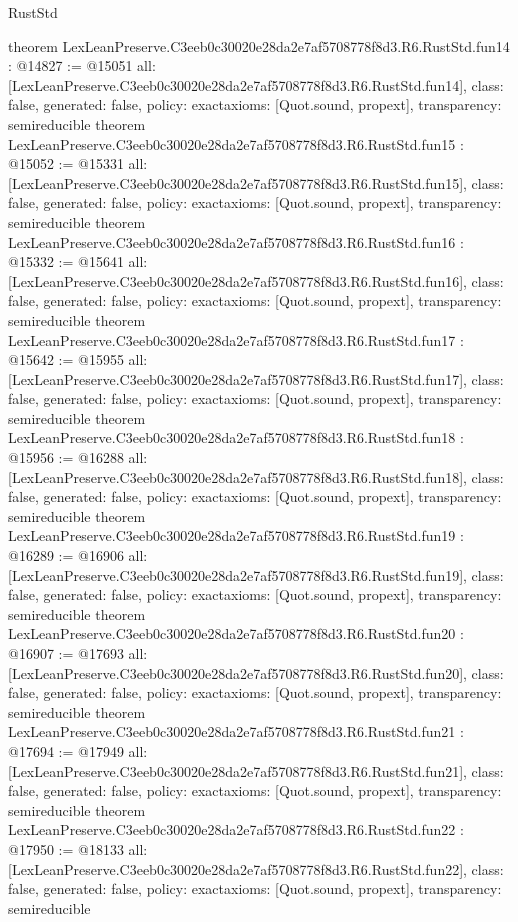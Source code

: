 \begin{lexlean}{RustStd}
\begin{coremodule}
{}
theorem LexLeanPreserve.C3eeb0c30020e28da2e7af5708778f8d3.R6.RustStd.fun14 : @14827 := @15051 {
  all: [LexLeanPreserve.C3eeb0c30020e28da2e7af5708778f8d3.R6.RustStd.fun14],
  class: false,
  generated: false,
  policy: exact{axioms: [Quot.sound, propext]},
  transparency: semireducible
}
theorem LexLeanPreserve.C3eeb0c30020e28da2e7af5708778f8d3.R6.RustStd.fun15 : @15052 := @15331 {
  all: [LexLeanPreserve.C3eeb0c30020e28da2e7af5708778f8d3.R6.RustStd.fun15],
  class: false,
  generated: false,
  policy: exact{axioms: [Quot.sound, propext]},
  transparency: semireducible
}
theorem LexLeanPreserve.C3eeb0c30020e28da2e7af5708778f8d3.R6.RustStd.fun16 : @15332 := @15641 {
  all: [LexLeanPreserve.C3eeb0c30020e28da2e7af5708778f8d3.R6.RustStd.fun16],
  class: false,
  generated: false,
  policy: exact{axioms: [Quot.sound, propext]},
  transparency: semireducible
}
theorem LexLeanPreserve.C3eeb0c30020e28da2e7af5708778f8d3.R6.RustStd.fun17 : @15642 := @15955 {
  all: [LexLeanPreserve.C3eeb0c30020e28da2e7af5708778f8d3.R6.RustStd.fun17],
  class: false,
  generated: false,
  policy: exact{axioms: [Quot.sound, propext]},
  transparency: semireducible
}
theorem LexLeanPreserve.C3eeb0c30020e28da2e7af5708778f8d3.R6.RustStd.fun18 : @15956 := @16288 {
  all: [LexLeanPreserve.C3eeb0c30020e28da2e7af5708778f8d3.R6.RustStd.fun18],
  class: false,
  generated: false,
  policy: exact{axioms: [Quot.sound, propext]},
  transparency: semireducible
}
theorem LexLeanPreserve.C3eeb0c30020e28da2e7af5708778f8d3.R6.RustStd.fun19 : @16289 := @16906 {
  all: [LexLeanPreserve.C3eeb0c30020e28da2e7af5708778f8d3.R6.RustStd.fun19],
  class: false,
  generated: false,
  policy: exact{axioms: [Quot.sound, propext]},
  transparency: semireducible
}
theorem LexLeanPreserve.C3eeb0c30020e28da2e7af5708778f8d3.R6.RustStd.fun20 : @16907 := @17693 {
  all: [LexLeanPreserve.C3eeb0c30020e28da2e7af5708778f8d3.R6.RustStd.fun20],
  class: false,
  generated: false,
  policy: exact{axioms: [Quot.sound, propext]},
  transparency: semireducible
}
theorem LexLeanPreserve.C3eeb0c30020e28da2e7af5708778f8d3.R6.RustStd.fun21 : @17694 := @17949 {
  all: [LexLeanPreserve.C3eeb0c30020e28da2e7af5708778f8d3.R6.RustStd.fun21],
  class: false,
  generated: false,
  policy: exact{axioms: [Quot.sound, propext]},
  transparency: semireducible
}
theorem LexLeanPreserve.C3eeb0c30020e28da2e7af5708778f8d3.R6.RustStd.fun22 : @17950 := @18133 {
  all: [LexLeanPreserve.C3eeb0c30020e28da2e7af5708778f8d3.R6.RustStd.fun22],
  class: false,
  generated: false,
  policy: exact{axioms: [Quot.sound, propext]},
  transparency: semireducible
}
\end{coremodule}
\end{lexlean}
